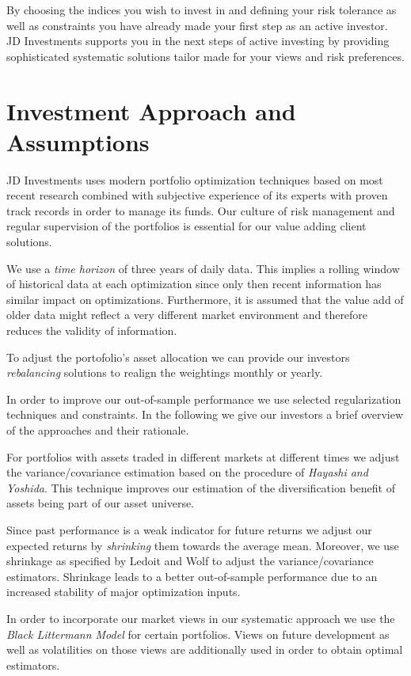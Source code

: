 \documentclass[11pt, parskip=full, DIV=14]{scrreprt}
\begin{document}
By choosing the indices you wish to invest in and defining your risk tolerance as well as constraints you have already made your first step as an active investor.
JD Investments supports you in the next steps of active investing by providing sophisticated systematic solutions tailor made for your views and risk preferences.

 
\section*{Investment Approach and Assumptions}
JD Investments uses modern portfolio optimization techniques based on most recent research combined with subjective experience of its experts with proven track records in order to manage its funds.
Our culture of risk management and regular supervision of the portfolios is essential for our value adding client solutions.

We use a \textit{time horizon} of three years of daily data.
This implies a rolling window of historical data at each optimization since only then recent information has similar impact on optimizations.
Furthermore, it is assumed that the value add of older data might reflect a very different market environment and therefore reduces the validity of information.

To adjust the portofolio’s asset allocation we can provide our investors \textit{rebalancing} solutions to realign the weightings monthly or yearly.

In order to improve our out-of-sample performance we use selected regularization techniques and constraints.
In the following we give our investors a brief overview of the approaches and their rationale.
 
For portfolios with assets traded in different markets at different times we adjust the variance/covariance estimation based on the procedure of \textit{Hayashi and Yoshida}.
This technique improves our estimation of the diversification benefit of assets being part of our asset universe.

Since past performance is a weak indicator for future returns we adjust our expected returns by \textit{shrinking} them towards the average mean.
Moreover, we use shrinkage as specified by Ledoit and Wolf to adjust the variance/covariance estimators.
Shrinkage leads to a better out-of-sample performance due to an increased stability of major optimization inputs.

In order to incorporate our market views in our systematic approach we use the \textit{Black Littermann Model} for certain portfolios.
Views on future development as well as volatilities on those views are additionally used in order to obtain optimal estimators.
\end{document}
